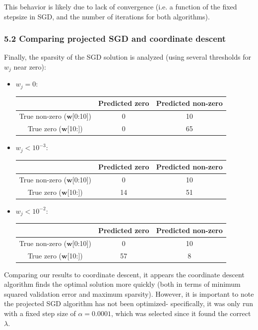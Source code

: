 \documentclass[paper=a4, fontsize=11pt]{scrartcl} %
\numberwithin{equation}{section} %
\numberwithin{figure}{section} %
\numberwithin{table}{section} %
\begin{document}
This behavior is likely due to lack of convergence (i.e. a function of the fixed stepsize in SGD, and the number of iterations for both algorithms).

\subsubsection*{5.2 Comparing projected SGD and coordinate descent}

Finally, the sparsity of the SGD solution is analyzed (using several thresholds for $w_j$ near zero):

\begin{itemize}

\item $w_j  = 0$:

\begin{center}
\begin{tabular}{| c | c | c |}
\hline
	& Predicted zero &  Predicted non-zero\\
\hline
True non-zero ($\bm{w}$[0:10]) &  0 &  10 \\
\hline
True zero ($\bm{w}$[10:]) & 0 & 65 \\
\hline
\end{tabular}\end{center}

\item $w_j < 10^{-3}$:

\begin{center}
\begin{tabular}{| c | c | c |}
\hline
	& Predicted zero &  Predicted non-zero\\
\hline
True non-zero ($\bm{w}$[0:10]) &  0 &  10 \\
\hline
True zero ($\bm{w}$[10:]) & 14 & 51 \\
\hline
\end{tabular}\end{center}

\item $w_j < 10^{-2}$:

\begin{center}
\begin{tabular}{| c | c | c |}
\hline
	& Predicted zero &  Predicted non-zero\\
\hline
True non-zero ($\bm{w}$[0:10]) &  0 &  10 \\
\hline
True zero ($\bm{w}$[10:]) & 57 & 8 \\
\hline
\end{tabular}\end{center}

\end{itemize}

Comparing our results to coordinate descent, it appears the coordinate descent algorithm finds the optimal solution more quickly (both in terms of minimum squared validation error and maximum sparsity). However, it is important to note the projected SGD algorithm has not been optimized- specifically, it was only run with a fixed step size of $\alpha = 0.0001$, which was selected since it found the correct $\lambda$.

\end{document}
